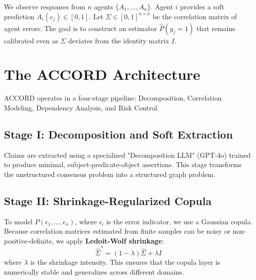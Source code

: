 \documentclass[conference]{IEEEtran}
\begin{document}
We observe responses from $n$ agents $\{A_1, \dots, A_n\}$. Agent $i$ provides a soft prediction $A_i(c_j) \in [0, 1]$. Let $\Sigma \in [0, 1]^{n \times n}$ be the correlation matrix of agent errors. The goal is to construct an estimator $\hat{P}(y_j=1)$ that remains calibrated even as $\Sigma$ deviates from the identity matrix $I$.

\section{The ACCORD Architecture}
\label{sec:framework}

ACCORD operates in a four-stage pipeline: Decomposition, Correlation Modeling, Dependency Analysis, and Risk Control.

\subsection{Stage I: Decomposition and Soft Extraction}
Claims are extracted using a specialized "Decomposition LLM" (GPT-4o) trained to produce minimal, subject-predicate-object assertions. This stage transforms the unstructured consensus problem into a structured graph problem.

\subsection{Stage II: Shrinkage-Regularized Copula}
To model $P(\epsilon_1, \dots, \epsilon_n)$, where $\epsilon_i$ is the error indicator, we use a Gaussian copula. Because correlation matrices estimated from finite samples can be noisy or non-positive-definite, we apply \textbf{Ledoit-Wolf shrinkage}:
\begin{equation}
    \hat{\Sigma}^* = (1 - \lambda)\hat{\Sigma} + \lambda I
\end{equation}
where $\lambda$ is the shrinkage intensity. This ensures that the copula layer is numerically stable and generalizes across different domains.
\end{document}
